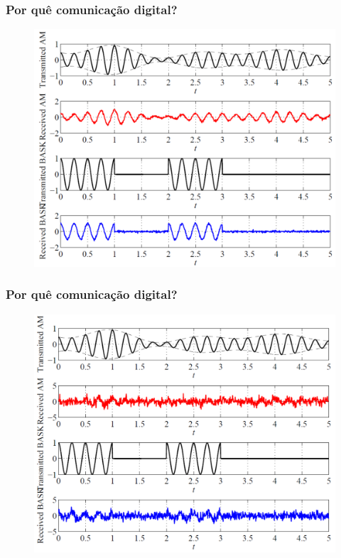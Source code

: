 \begin{frame}
    \frametitle{Por quê comunicação digital?}
    
    \begin{figure}[t]
	  \begin{center}
	    \includegraphics[width=0.77\columnwidth]{figs/fig03}
	  \end{center}
	\end{figure}
\end{frame}

\begin{frame}
    \frametitle{Por quê comunicação digital?}
    
    \begin{figure}[t]
	  \begin{center}
	    \includegraphics[width=0.77\columnwidth]{figs/fig04}
	  \end{center}
	\end{figure}
\end{frame}

